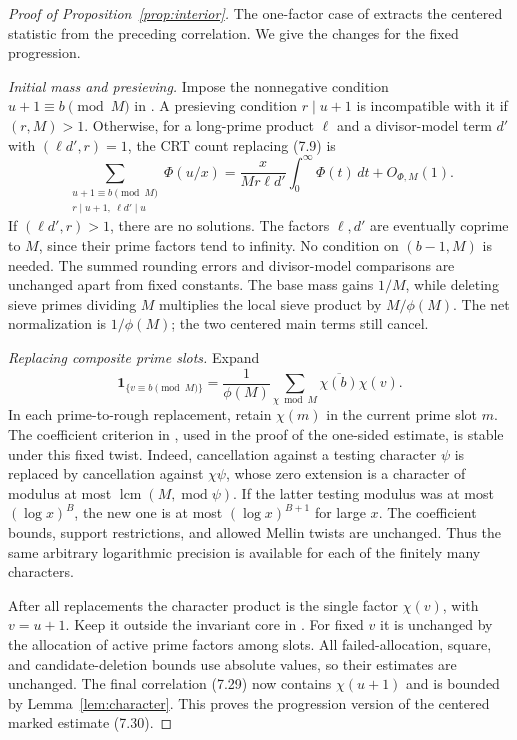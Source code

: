 \documentclass[11pt]{article}
\theoremstyle{remark}
\newcommand{\1}{\mathbf 1}
\begin{document}
\begin{proof}[Proof of Proposition~\ref{prop:interior}]
The one-factor case of \cite[Section~7]{PD} extracts the
centered statistic from the preceding correlation.  We give
the changes for the fixed progression.

\emph{Initial mass and presieving.}
Impose the nonnegative condition $u+1\equiv b\pmod M$ in
\cite[Lemma~7.2]{PD}.  A presieving condition $r\mid u+1$
is incompatible with it if $(r,M)>1$.  Otherwise, for a
long-prime product $\ell$ and a divisor-model term $d'$ with
$(\ell d',r)=1$, the CRT count replacing (7.9) is
\[
 \sum_{\substack{u+1\equiv b\pmod M\\r\mid u+1,\ \ell d'\mid u}}
 \Phi(u/x)
 =\frac{x}{Mr\ell d'}\int_0^\infty\Phi(t)\,dt
   +O_{\Phi,M}(1).
\]
If $(\ell d',r)>1$, there are no solutions.  The factors
$\ell,d'$ are eventually coprime to $M$, since their prime
factors tend to infinity.  No condition on $(b-1,M)$ is needed.
The summed rounding errors and divisor-model comparisons are
unchanged apart from fixed constants.  The base mass gains
$1/M$, while deleting sieve primes dividing $M$ multiplies the
local sieve product by $M/\phi(M)$.  The net normalization is
$1/\phi(M)$; the two centered main terms still cancel.

\emph{Replacing composite prime slots.}
Expand
\[
 \1_{\{v\equiv b\pmod M\}}
 =\frac1{\phi(M)}\sum_{\chi\bmod M}
                       \overline{\chi(b)}\chi(v).
\]
In each prime-to-rough replacement, retain $\chi(m)$ in the
current prime slot $m$.  The coefficient criterion in
\cite[Lemma~10.2]{OAI}, used in the proof of the one-sided
estimate, is stable under this fixed twist.  Indeed, cancellation
against a testing character $\psi$ is replaced by cancellation
against $\chi\psi$, whose zero extension is a character of
modulus at most $\operatorname{lcm}(M,\operatorname{mod}\psi)$.
If the latter testing modulus was at most $(\log x)^B$, the
new one is at most $(\log x)^{B+1}$ for large $x$.  The
coefficient bounds, support restrictions, and allowed Mellin
twists are unchanged.  Thus the same arbitrary logarithmic
precision is available for each of the finitely many characters.

After all replacements the character product is the single
factor $\chi(v)$, with $v=u+1$.  Keep it outside the invariant
core in \cite[(7.26)]{PD}.  For fixed $v$ it is unchanged by
the allocation of active prime factors among slots.  All
failed-allocation, square, and candidate-deletion bounds use
absolute values, so their estimates are unchanged.  The final
correlation (7.29) now contains $\chi(u+1)$ and is bounded by
Lemma~\ref{lem:character}.  This proves the progression version
of the centered marked estimate (7.30).


\end{proof}
\end{document}
